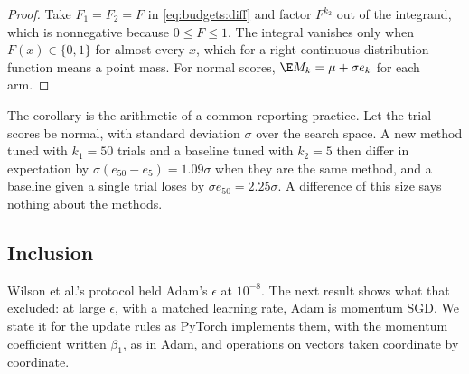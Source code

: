 \begin{refsection}

\begin{proof}
Take $F_1=F_2=F$ in \eqref{eq:budgets:diff} and factor $F^{k_2}$ out of the integrand, which is nonnegative because $0\le F\le1$. The integral vanishes only when $F(x)\in\{0,1\}$ for almost every $x$, which for a right-continuous distribution function means a point mass. For normal scores, $\E M_k=\mu+\sigma e_k$ for each arm.
\end{proof}

The corollary is the arithmetic of a common reporting practice. Let the trial scores be normal, with standard deviation $\sigma$ over the search space. A new method tuned with $k_1=50$ trials and a baseline tuned with $k_2=5$ then differ in expectation by $\sigma(e_{50}-e_5)=1.09\sigma$ when they are the same method, and a baseline given a single trial loses by $\sigma e_{50}=2.25\sigma$. A difference of this size says nothing about the methods.

\subsection*{Inclusion}

Wilson et al.'s protocol held Adam's $\epsilon$ at $10^{-8}$. The next result shows what that excluded: at large $\epsilon$, with a matched learning rate, Adam is momentum SGD. We state it for the update rules as PyTorch implements them, with the momentum coefficient written $\beta_1$, as in Adam, and operations on vectors taken coordinate by coordinate.


\end{refsection}
